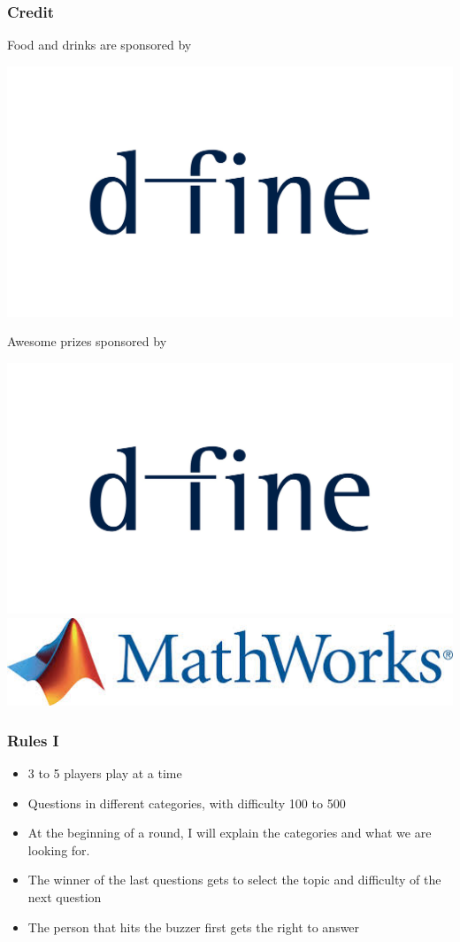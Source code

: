 \documentclass{beamer}
\begin{document}
	\begin{frame}
		\frametitle{Credit}
		Food and drinks are sponsored by 
			\begin{center}
				{\includegraphics[scale = 0.3]{../orga/d-fine_cmyk_100_75_10_60_pz.jpg}}
			\end{center}
			\pause
		Awesome prizes sponsored by 
		\begin{center}
			{\includegraphics[scale = 0.3]{../orga/d-fine_cmyk_100_75_10_60_pz.jpg}} 
			\newline
			{\includegraphics[scale = 0.3]{mathworks.jpg}}
		\end{center}
	\end{frame}
		
	\begin{frame}
		\frametitle{Rules I}
		\begin{itemize}
			\item 3 to 5 players play at a time
			\item Questions in different categories, with difficulty 100 to 500 
			\item At the beginning of a round, I will explain the categories and what we are looking for.
			\item The winner of the last questions gets to select the topic and difficulty of the next question
			\item The person that hits the buzzer first gets the right to answer
		\end{itemize}
	\end{frame}
	
\end{document}
